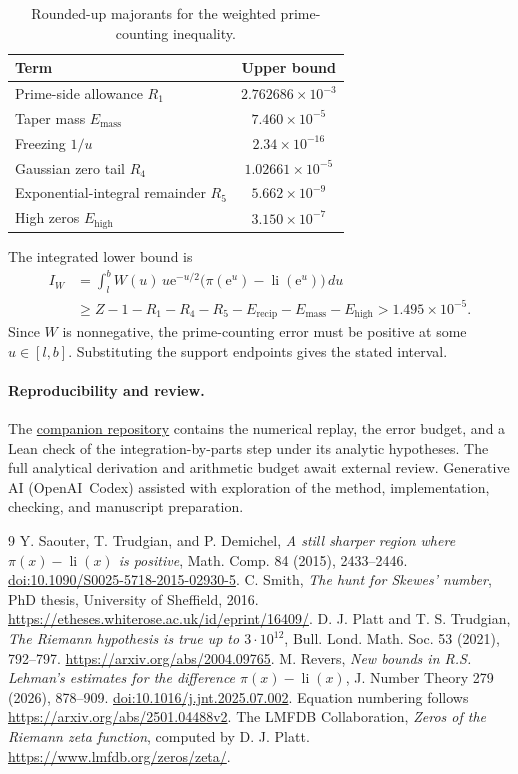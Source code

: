 \documentclass[11pt]{article}
\newcommand{\lii}{\operatorname{li}}
\newcommand{\ee}{\mathrm{e}}
\begin{document}
\begin{table}[htbp]
\centering
\begin{tabular}{lc}
\toprule
Term & Upper bound\\
\midrule
Prime-side allowance $R_1$ & $2.762686\times10^{-3}$\\
Taper mass $E_{\mathrm{mass}}$ & $7.460\times10^{-5}$\\
Freezing $1/u$ & $2.34\times10^{-16}$\\
Gaussian zero tail $R_4$ & $1.02661\times10^{-5}$\\
Exponential-integral remainder $R_5$ & $5.662\times10^{-9}$\\
High zeros $E_{\mathrm{high}}$ & $3.150\times10^{-7}$\\
\bottomrule
\end{tabular}
\caption{Rounded-up majorants for the weighted prime-counting inequality.}
\end{table}

The integrated lower bound is
\begin{align*}
I_W&=\int_l^b W(u)\,u\ee^{-u/2}\bigl(\pi(\ee^u)-\lii(\ee^u)\bigr)\,du\\
&\ge Z-1-R_1-R_4-R_5-E_{\mathrm{recip}}-E_{\mathrm{mass}}-E_{\mathrm{high}}
>1.495\times10^{-5}.
\end{align*}
Since $W$ is nonnegative, the prime-counting error must be positive
at some $u\in[l,b]$. Substituting the support endpoints gives the
stated interval.

\paragraph{Reproducibility and review.}
The \href{https://github.com/domcity2003/skewes-hunt}{companion repository}
contains the numerical replay, the error budget, and a Lean check of the
integration-by-parts step under its analytic hypotheses.
The full analytical derivation and arithmetic budget await external review.
Generative AI (\mbox{OpenAI Codex}) assisted with exploration of the method,
implementation, checking, and manuscript preparation.

\begin{thebibliography}{9}
Y. Saouter, T. Trudgian, and P. Demichel,
\emph{A still sharper region where $\pi(x)-\lii(x)$ is positive},
Math. Comp. 84 (2015), 2433--2446.
\href{https://doi.org/10.1090/S0025-5718-2015-02930-5}{doi:10.1090/S0025-5718-2015-02930-5}.
C. Smith, \emph{The hunt for Skewes' number}, PhD thesis,
University of Sheffield, 2016.
\url{https://etheses.whiterose.ac.uk/id/eprint/16409/}.
D. J. Platt and T. S. Trudgian, \emph{The Riemann hypothesis is true
up to $3\cdot10^{12}$}, Bull. Lond. Math. Soc. 53 (2021), 792--797.
\url{https://arxiv.org/abs/2004.09765}.
M. Revers, \emph{New bounds in R.S. Lehman's estimates for the
difference $\pi(x)-\lii(x)$}, J. Number Theory 279 (2026), 878--909.
\href{https://doi.org/10.1016/j.jnt.2025.07.002}{doi:10.1016/j.jnt.2025.07.002}.
Equation numbering follows \url{https://arxiv.org/abs/2501.04488v2}.
The LMFDB Collaboration, \emph{Zeros of the Riemann zeta function},
computed by D. J. Platt. \url{https://www.lmfdb.org/zeros/zeta/}.
\end{thebibliography}
\end{document}
